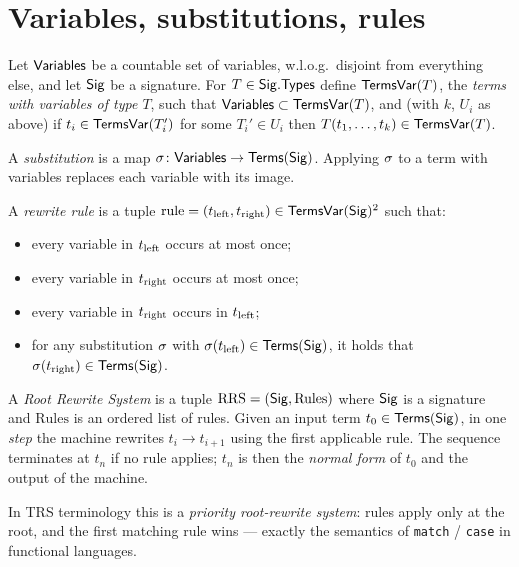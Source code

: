 \documentclass[11pt]{article}
\begin{document}
\section{Variables, substitutions, rules}

\begin{definition}
Let $\mathsf{Variables}$ be a countable set of variables, w.l.o.g.\ disjoint from
everything else, and let $\mathsf{Sig}$ be a signature. For $T \in \mathsf{Sig}.\mathsf{Types}$ define
$\mathsf{TermsVar}(T)$, the \emph{terms with variables of type $T$}, such that
$\mathsf{Variables} \subset \mathsf{TermsVar}(T)$, and (with $k$, $U_i$ as above) if
$t_i \in \mathsf{TermsVar}(T_i')$ for some $T_i' \in U_i$ then
$T(t_1, \dots, t_k) \in \mathsf{TermsVar}(T)$.
\end{definition}

\begin{definition}[Substitution]
A \emph{substitution} is a map $\sigma \colon \mathsf{Variables} \to \mathsf{Terms}(\mathsf{Sig})$.
Applying $\sigma$ to a term with variables replaces each variable with its image.
\end{definition}

\begin{definition}
A \emph{rewrite rule} is a tuple
$\mathrm{rule} = (t_{\mathrm{left}}, t_{\mathrm{right}}) \in \mathsf{TermsVar}(\mathsf{Sig})^2$ such that:
\begin{itemize}
  \item every variable in $t_{\mathrm{left}}$ occurs at most once;
  \item every variable in $t_{\mathrm{right}}$ occurs at most once;
  \item every variable in $t_{\mathrm{right}}$ occurs in $t_{\mathrm{left}}$;
  \item for any substitution $\sigma$ with $\sigma(t_{\mathrm{left}}) \in \mathsf{Terms}(\mathsf{Sig})$,
        it holds that $\sigma(t_{\mathrm{right}}) \in \mathsf{Terms}(\mathsf{Sig})$.
\end{itemize}
\end{definition}

\begin{definition}
A \emph{Root Rewrite System} is a tuple $\mathrm{RRS} = (\mathsf{Sig}, \mathrm{Rules})$
where $\mathsf{Sig}$ is a signature and $\mathrm{Rules}$ is an ordered list of rules.
Given an input term $t_0 \in \mathsf{Terms}(\mathsf{Sig})$, in one \emph{step} the machine
rewrites $t_i \to t_{i+1}$ using the first applicable rule. The sequence
terminates at $t_n$ if no rule applies; $t_n$ is then the \emph{normal form} of
$t_0$ and the output of the machine.
\end{definition}

\begin{note}
In TRS terminology this is a \emph{priority root-rewrite system}: rules apply
only at the root, and the first matching rule wins --- exactly the semantics of
\texttt{match} / \texttt{case} in functional languages.
\end{note}
\end{document}
